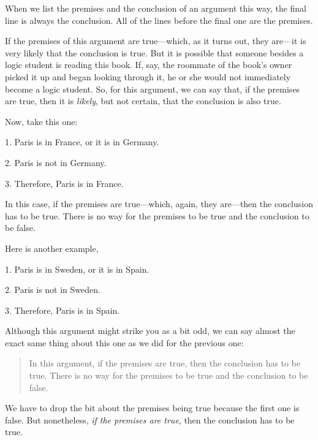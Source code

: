 \begin{notebox}
When we list the premises and the conclusion of an argument this way, the final line is always the conclusion. All of the lines before the final one are the premises.
\end{notebox}

\noindent If the premises of this argument are true---which, as it turns out, they are---it is very likely that the conclusion is true. But it is possible that someone besides a logic student is reading this book. If, say, the roommate of the book's owner picked it up and began looking through it, he or she would not immediately become a logic student. So, for this argument, we can say that, if the premises are true, then it is \textit{likely}, but not certain, that the conclusion is also true. 

Now, take this one:
	\begin{earg}\label{valid-bananas}
		\item[1.] Paris is in France, or it is in Germany.
		\item[2.] Paris is not in Germany.
		\item[3.] Therefore, Paris is in France.
	\end{earg}
In this case, if the premises are true---which, again, they are---then the conclusion has to be true. There is no way for the premises to be true and the conclusion to be false. 

Here is another example,
\smallskip

\noindent\begin{minipage}{0.99\textwidth}
	\begin{earg}
		\item[1.] Paris is in Sweden, or it is in Spain.
		\item[2.] Paris is not in Sweden. 
		\item[3.] Therefore, Paris is in Spain.
	\end{earg}
\smallskip
\end{minipage}

\noindent Although this argument might strike you as a bit odd, we can say almost the exact same thing about this one as we did for the previous one:
\begin{quote}
In this argument, if the premises are true, then the conclusion has to be true. There is no way for the premises to be true and the conclusion to be false. 
\end{quote}
We have to drop the bit about the premises being true because the first one is false. But nonetheless, \textit{if the premises are true}, then the conclusion has to be true. 

